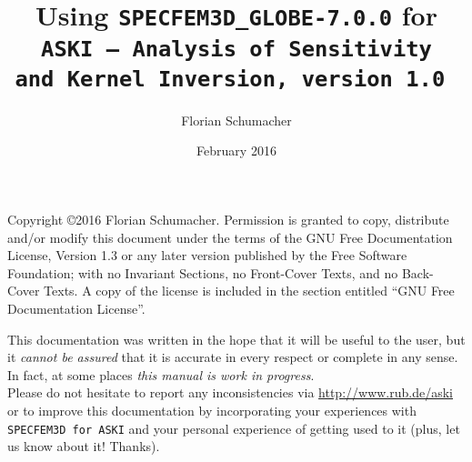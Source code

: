 \documentclass[12pt,a4paper]{article}
\newcommand{\lcode}[1]{\nolinkurl{#1}}
\begin{document}
%
\setlength{\parindent}{0cm}
\addtolength{\parskip}{0.5em}
%
%
%
\title{Using {\tt \Huge SPECFEM3D\_GLOBE-7.0.0} for \\ \tt {\Huge ASKI} {\rm--} {\Huge A}{\large nalysis of} {\Huge S}{\large ensitivity \\ and} {\Huge\tt K}{\large ernel} {\Huge\tt I}{\large nversion, version 1.0} }
\author[1]{Florian Schumacher}
\date{February 2016}
\maketitle
%
Copyright \copyright 2016 Florian Schumacher.
Permission is granted to copy, distribute and/or modify this document
under the terms of the GNU Free Documentation License, Version 1.3
or any later version published by the Free Software Foundation;
with no Invariant Sections, no Front-Cover Texts, and no Back-Cover Texts.
A copy of the license is included in the section entitled ``GNU
Free Documentation License''.

\vspace{1cm}

This documentation was written in the hope that it will be useful to the user,
but it \emph{cannot be assured} that it is accurate in every respect or complete in any sense.
In fact, at some places \emph{this manual is work in progress}.\\
Please do not hesitate to report any inconsistencies via \url{http://www.rub.de/aski} or
to improve this documentation by incorporating your experiences with \lcode{SPECFEM3D for ASKI} 
and your personal experience of getting used to it (plus, let us know about it! Thanks). 
\end{document}
